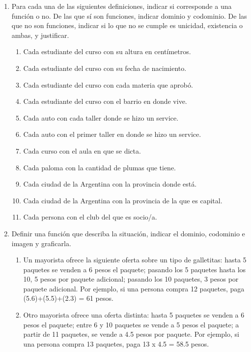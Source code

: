 \documentclass[a4paper]{article}
\newcommand{\exercise}{\item}
\begin{document}
\begin{enumerate}
	\exercise Para cada una de las siguientes definiciones, indicar si corresponde a una función o no. De las que sí son funciones, indicar dominio y codominio. De las que no son funciones, indicar si lo que no se cumple es unicidad, existencia o ambas, y justificar.
	\begin{enumerate} [label=(\alph*)]
		\item Cada estudiante del curso con su altura en centímetros.
		\item Cada estudiante del curso con su fecha de nacimiento.
		\item Cada estudiante del curso con cada materia que aprobó.
		\item Cada estudiante del curso con el barrio en donde vive.
		\item Cada auto con cada taller donde se hizo un service.
		\item Cada auto con el primer taller en donde se hizo un service.
		\item Cada curso con el aula en que se dicta.
		\item Cada paloma con la cantidad de plumas que tiene.
		\item Cada ciudad de la Argentina con la provincia donde está.
		\item Cada ciudad de la Argentina con la provincia de la que es capital.
		\item Cada persona con el club del que es socio/a.
	\end{enumerate}

	\exercise Definir una función que describa la situación, indicar el dominio, codominio e imagen y graficarla.
	\begin{enumerate} [label=(\alph*)]
		\item Un mayorista ofrece la siguiente oferta sobre un tipo de galletitas: hasta 5 paquetes se venden a 6 pesos el paquete; pasando los 5 paquetes hasta los 10, 5 pesos por paquete adicional; pasando los 10 paquetes, 3 pesos por paquete adicional. Por ejemplo, si una persona compra 12 paquetes, paga (5.6)+(5.5)+(2.3) = 61 pesos.

		\item Otro mayorista ofrece una oferta distinta: hasta 5 paquetes se venden a 6 pesos el paquete; entre 6 y 10 paquetes se vende a 5 pesos el paquete; a partir de 11
		paquetes, se vende a 4.5 pesos por paquete. Por ejemplo, si una persona compra 13
		paquetes, paga 13 x 4.5 = 58.5 pesos.


\end{enumerate}
\end{enumerate}
\end{document}
